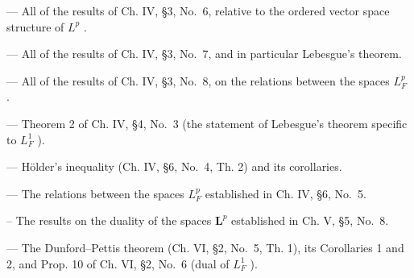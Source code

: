 --- All of the results of Ch. IV, §3, No.~6, relative to the ordered vector space structure of \(L^{p}\) .

--- All of the results of Ch. IV, §3, No.~7, and in particular Lebesgue's theorem.

--- All of the results of Ch. IV, §3, No.~8, on the relations between the spaces \(L_F^p\) .

--- Theorem 2 of Ch. IV, §4, No.~3 (the statement of Lebesgue's theorem specific to \(L_F^1\) ).

--- Hölder's inequality (Ch. IV, §6, No.~4, Th. 2) and its corollaries.

--- The relations between the spaces \(L_{F}^{p}\) established in Ch. IV, §6, No.~5.

-- The results on the duality of the spaces \(\mathbf{L}^p\) established in Ch. V, §5, No.~8.

--- The Dunford--Pettis theorem (Ch. VI, §2, No.~5, Th. 1), its Corollaries 1 and 2, and Prop. 10 of Ch. VI, §2, No.~6 (dual of \(L_{F}^{1}\) ).

